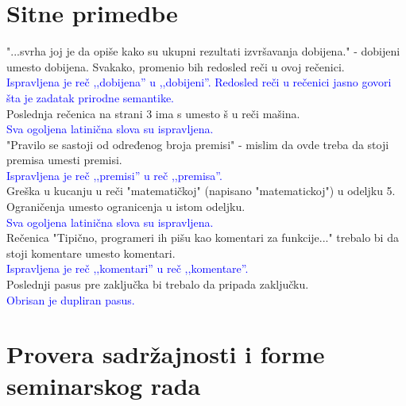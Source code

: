 \documentclass[a4paper]{report}
\newcommand{\odgovor}[1]{\textcolor{blue}{#1}}
\begin{document}
\section{Sitne primedbe}
"...svrha joj je da opiše kako su ukupni rezultati izvršavanja dobijena." - dobijeni umesto dobijena. Svakako, promenio bih redosled reči u ovoj rečenici.\\
 \odgovor{Ispravljena je reč ,,dobijena'' u ,,dobijeni''. Redosled reči u rečenici jasno govori šta je zadatak prirodne semantike.}\\
Poslednja rečenica na strani 3 ima s umesto š u reči mašina.\\
\odgovor{Sva ogoljena latinična slova su ispravljena.}\\
 "Pravilo se sastoji od određenog broja premisi" - mislim da ovde treba da stoji premisa umesti premisi.\\
 \odgovor{Ispravljena je reč ,,premisi'' u reč ,,premisa''.}\\
  Greška u kucanju u reči "matematičkoj" (napisano "matematickoj") u odeljku 5. Ograničenja umesto ogranicenja u istom odeljku.\\
  \odgovor{Sva ogoljena latinična slova su ispravljena.}\\
   Rečenica "Tipično, programeri ih pišu kao komentari za funkcije..." trebalo bi da stoji komentare umesto komentari.\\
   \odgovor{Ispravljena je reč ,,komentari'' u reč ,,komentare''.}\\
   Poslednji pasus pre zaključka bi trebalo da pripada zaključku.\\
    \odgovor{Obrisan je dupliran pasus.}

\section{Provera sadržajnosti i forme seminarskog rada}
\end{document}
